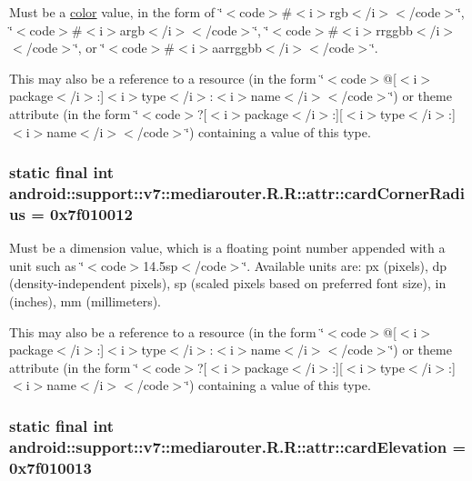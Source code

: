Must be a \hyperlink{classandroid_1_1support_1_1v7_1_1mediarouter_1_1_r_1_1color}{color} value, in the form of \char`\"{}$<$code$>$\#$<$i$>$rgb$<$/i$>$$<$/code$>$\char`\"{}, \char`\"{}$<$code$>$\#$<$i$>$argb$<$/i$>$$<$/code$>$\char`\"{}, \char`\"{}$<$code$>$\#$<$i$>$rrggbb$<$/i$>$$<$/code$>$\char`\"{}, or \char`\"{}$<$code$>$\#$<$i$>$aarrggbb$<$/i$>$$<$/code$>$\char`\"{}. 

This may also be a reference to a resource (in the form \char`\"{}$<$code$>$@\mbox{[}$<$i$>$package$<$/i$>$:\mbox{]}$<$i$>$type$<$/i$>$:$<$i$>$name$<$/i$>$$<$/code$>$\char`\"{}) or theme attribute (in the form \char`\"{}$<$code$>$?\mbox{[}$<$i$>$package$<$/i$>$:\mbox{]}\mbox{[}$<$i$>$type$<$/i$>$:\mbox{]}$<$i$>$name$<$/i$>$$<$/code$>$\char`\"{}) containing a value of this type. \hypertarget{classandroid_1_1support_1_1v7_1_1mediarouter_1_1_r_1_1attr_16d0b96c39262ed9ef16f73db7b3d92a}{
\subsubsection[{cardCornerRadius}]{\setlength{\rightskip}{0pt plus 5cm}static final int android::support::v7::mediarouter.R.R::attr::cardCornerRadius = 0x7f010012}}
\label{classandroid_1_1support_1_1v7_1_1mediarouter_1_1_r_1_1attr_16d0b96c39262ed9ef16f73db7b3d92a}


Must be a dimension value, which is a floating point number appended with a unit such as \char`\"{}$<$code$>$14.5sp$<$/code$>$\char`\"{}. Available units are: px (pixels), dp (density-independent pixels), sp (scaled pixels based on preferred font size), in (inches), mm (millimeters). 

This may also be a reference to a resource (in the form \char`\"{}$<$code$>$@\mbox{[}$<$i$>$package$<$/i$>$:\mbox{]}$<$i$>$type$<$/i$>$:$<$i$>$name$<$/i$>$$<$/code$>$\char`\"{}) or theme attribute (in the form \char`\"{}$<$code$>$?\mbox{[}$<$i$>$package$<$/i$>$:\mbox{]}\mbox{[}$<$i$>$type$<$/i$>$:\mbox{]}$<$i$>$name$<$/i$>$$<$/code$>$\char`\"{}) containing a value of this type. \hypertarget{classandroid_1_1support_1_1v7_1_1mediarouter_1_1_r_1_1attr_f04c4a7e443f1e79b88d9ef40120660a}{
\subsubsection[{cardElevation}]{\setlength{\rightskip}{0pt plus 5cm}static final int android::support::v7::mediarouter.R.R::attr::cardElevation = 0x7f010013}}
\label{classandroid_1_1support_1_1v7_1_1mediarouter_1_1_r_1_1attr_f04c4a7e443f1e79b88d9ef40120660a}


